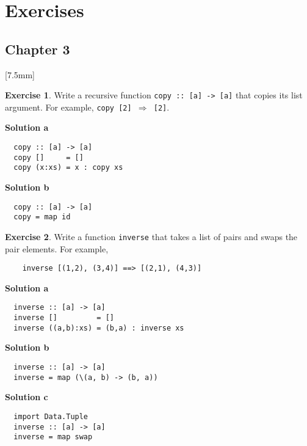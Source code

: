 \documentclass[11pt,a4paper]{article}
\theoremstyle{definition}
\newtheorem{exr}{Exercise}
\begin{document}
\section*{Exercises}


\subsection*{Chapter 3}

[7.5mm]



\begin{exr}
  Write a recursive function \texttt{copy :: [a] -> [a]} that copies 
  its list argument. For example, \texttt{copy [2] $\Rightarrow$ [2]}.
\end{exr}

\textbf{Solution a}
\begin{lstlisting}
  copy :: [a] -> [a]
  copy []     = []
  copy (x:xs) = x : copy xs
\end{lstlisting}

\textbf{Solution b}
\begin{lstlisting}
  copy :: [a] -> [a]
  copy = map id
\end{lstlisting}


\vspace{5mm}

\begin{exr}
  Write a function \texttt{inverse} that takes a list of pairs and 
  swaps the pair elements. For example,
  \begin{lstlisting}
    inverse [(1,2), (3,4)] ==> [(2,1), (4,3)]
  \end{lstlisting}
\end{exr}

\textbf{Solution a}
\begin{lstlisting}
  inverse :: [a] -> [a]
  inverse []         = []
  inverse ((a,b):xs) = (b,a) : inverse xs
\end{lstlisting}

\textbf{Solution b}
\begin{lstlisting}
  inverse :: [a] -> [a]
  inverse = map (\(a, b) -> (b, a))
\end{lstlisting}

\textbf{Solution c}
\begin{lstlisting}
  import Data.Tuple
  inverse :: [a] -> [a]
  inverse = map swap
\end{lstlisting}
\end{document}
